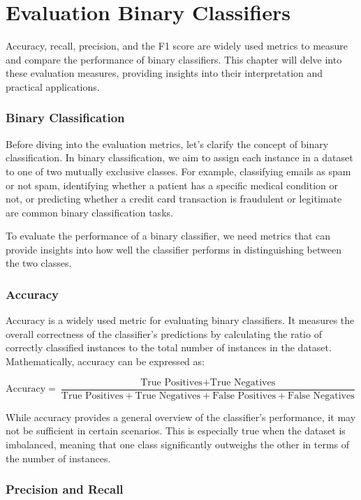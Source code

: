 \chapter{Evaluation Binary Classifiers}

Accuracy, recall, precision, and the F1 score are widely used metrics
to measure and compare the performance of binary classifiers. This
chapter will delve into these evaluation measures, providing insights
into their interpretation and practical applications.

\subsection{Binary Classification}

Before diving into the evaluation metrics, let's clarify the concept
of binary classification. In binary classification, we aim to assign
each instance in a dataset to one of two mutually exclusive
classes. For example, classifying emails as spam or not spam,
identifying whether a patient has a specific medical condition or not,
or predicting whether a credit card transaction is fraudulent or
legitimate are common binary classification tasks.

To evaluate the performance of a binary classifier, we need metrics
that can provide insights into how well the classifier performs in
distinguishing between the two classes.

\subsection{Accuracy}

Accuracy is a widely used metric for evaluating binary classifiers. It
measures the overall correctness of the classifier's predictions by
calculating the ratio of correctly classified instances to the total
number of instances in the dataset. Mathematically, accuracy can be
expressed as:

$$ \text{Accuracy} = \frac{\text{True Positives} + \text{True Negatives}} {
\text{True Positives} + \text{True Negatives} + \text{False Positives}+ \text{False Negatives}} $$
 

While accuracy provides a general overview of the classifier's
performance, it may not be sufficient in certain scenarios. This is
especially true when the dataset is imbalanced, meaning that one class
significantly outweighs the other in terms of the number of instances.

\subsection{Precision and Recall}

